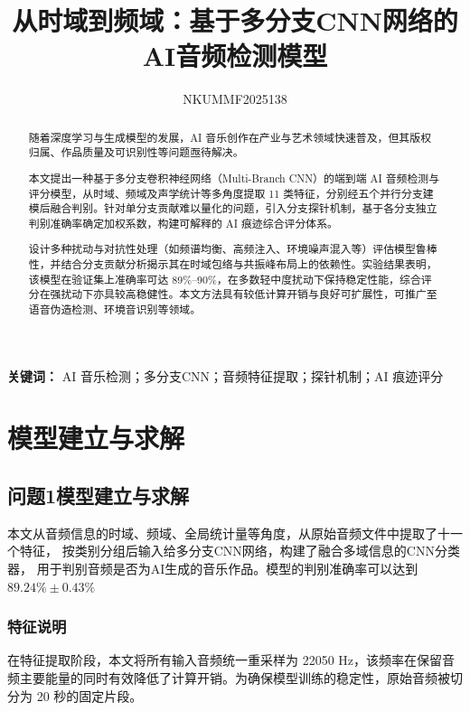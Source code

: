 \documentclass[a4paper,12pt]{article}
\title{从时域到频域：基于多分支CNN网络的AI音频检测模型}
\author{NKUMMF2025138}
\date{}
\begin{document}
\maketitle
\thispagestyle{plain}  %


\begin{abstract}
随着深度学习与生成模型的发展，AI 音乐创作在产业与艺术领域快速普及，但其版权归属、作品质量及可识别性等问题亟待解决。

本文提出一种基于多分支卷积神经网络（Multi-Branch CNN）的端到端 AI 音频检测与评分模型，从时域、频域及声学统计等多角度提取 11 类特征，分别经五个并行分支建模后融合判别。针对单分支贡献难以量化的问题，引入分支探针机制，基于各分支独立判别准确率确定加权系数，构建可解释的 AI 痕迹综合评分体系。

设计多种扰动与对抗性处理（如频谱均衡、高频注入、环境噪声混入等）评估模型鲁棒性，并结合分支贡献分析揭示其在时域包络与共振峰布局上的依赖性。实验结果表明，该模型在验证集上准确率可达 89\%–90\%，在多数轻中度扰动下保持稳定性能，综合评分在强扰动下亦具较高稳健性。本文方法具有较低计算开销与良好可扩展性，可推广至语音伪造检测、环境音识别等领域。
\end{abstract}
\vspace{1em}
\noindent\textbf{关键词：} AI 音乐检测；多分支CNN；音频特征提取；探针机制；AI 痕迹评分

\newpage  

\tableofcontents 
\newpage  

\section{模型建立与求解}
\subsection{问题1模型建立与求解}
本文从音频信息的时域、频域、全局统计量等角度，从原始音频文件中提取了十一个特征，
按类别分组后输入给多分支CNN网络，构建了融合多域信息的CNN分类器，
用于判别音频是否为AI生成的音乐作品。模型的判别准确率可以达到$89.24\% \pm 0.43\%$


\subsubsection{特征说明}
在特征提取阶段，本文将所有输入音频统一重采样为 22050 Hz，该频率在保留音频主要能量的同时有效降低了计算开销。为确保模型训练的稳定性，原始音频被切分为 20 秒的固定片段。
\end{document}
